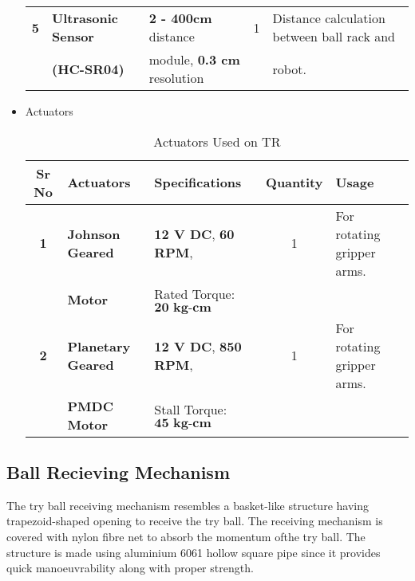 \begin{itemize}
\begin{table}[h]
\begin{tabular}{|c|l|l|c|l|}
                    \textbf{5}      & \textbf{Ultrasonic Sensor}        & \textbf{2 - 400cm} distance           &        1          & Distance calculation between ball rack and          \\ 
                                    & \textbf{(HC-SR04)}                & module, \textbf{0.3 cm} resolution    &                   & robot.                                              \\ \hline   \hline
                \end{tabular}
            \end{table}

            \item Actuators
            \begin{table}[h]
                \caption {Actuators Used on TR} \label{Actuators_TR}  \small
                \begin{tabular}{|c|l|l|c|l|}
                    \hline  \hline
                    \textbf{Sr No}  & \textbf{Actuators}        & \textbf{Specifications}               & \textbf{Quantity}  & \textbf{Usage}                                               \\ \hline   \hline
                    \textbf{1}      & \textbf{Johnson Geared}   & \textbf{12 V DC},  \textbf{60 RPM},   & 1                  & For rotating gripper arms.                                   \\
                                    & \textbf{Motor}            & Rated Torque: $\textbf{20 kg-cm}$     &                    &                                                              \\ \hline 
                    \textbf{2}      & \textbf{Planetary Geared} & \textbf{12 V DC},  \textbf{850 RPM},  & 1                  & For rotating gripper arms.                                   \\
                                    & \textbf{PMDC Motor}       & Stall Torque: $\textbf{45 kg-cm}$     &                    &                                                              \\ \hline   \hline  
                \end{tabular}
            \end{table}
        \end{itemize}


    \subsection{Ball Recieving Mechanism}
        The try ball receiving mechanism resembles a basket-like structure having trapezoid-shaped opening to receive the try ball. The 
        receiving mechanism is covered with nylon fibre net to absorb the momentum ofthe try ball. The structure is made using aluminium 6061 
        hollow square pipe since it provides quick manoeuvrability along with proper strength.
    
